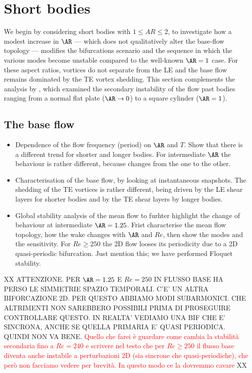 \section{Short bodies}
\label{sec:short}

We begin by considering short bodies with $1 \le AR \le 2$, to investigate how a modest increase in $\AR$ --- which does not qualitatively alter the base-flow topology --- modifies the bifurcations scenario and the sequence in which the various modes become unstable compared to the well-known $\AR=1$ case. For these aspect ratios, vortices do not separate from the LE and the base flow remains dominated by the TE vortex shedding. This section complements the analysis by \cite{choi-yang-2014}, which examined the secondary instability of the flow past bodies ranging from a normal flat plate ($\AR \rightarrow 0$) to a square cylinder ($\AR=1$).

\subsection{The base flow}

\begin{itemize}
  \item Dependence of the flow frequency (period) on $\AR$ and $T$. Show that there is a different trend for shorter and longer bodies. For intermediate $\AR$ the behaviour is rather different, because changes from the one to the other.
  \item Characterisation of the base flow, by looking at instantaneous snapshots. The shedding of the TE vortices is rather different, being driven by the LE shear layers for shorter bodies and by the TE shear layers by longer bodies.
  \item Global stability analysis of the mean flow to furhter highlight the change of behaviour at intermediate $\AR=1.25$. Frist characterise the mean flow topology, how the wake changes with $\AR$ and $Re$, then show the modes and the sensitivity. For $Re \ge 250$ the 2D flow looses its periodicity due to a 2D quasi-periodic bifurcation. Just mention this; we have performed Floquet stability.
\end{itemize}

XX ATTENZIONE. PER $\AR=1.25$ E $Re=250$ IN FLUSSO BASE HA PERSO LE SIMMETRIE SPAZIO TEMPORALI. C'E' UN ALTRA BIFORCAZIONE 2D. PER QUESTO ABBIAMO MODI SUBARMONICI. CHE ALTRIMENTI NON SAREBBERO POSSIBILI PRIMA DI PROSEGUIRE CONTROLLARE QUESTO. IN REALTA' VEDIAMO UNA BIF CHE E' SINCRONA, ANCHE SE QUELLA PRIMARIA E' QUASI PERIODICA. QUINDI NON VA BENE. \textcolor{red}{Quello che farei è guardare come cambia la stabilità secondaria fino a $Re=240$ e scrivere nel testo che per $Re \ge 250$ il flusso base diventa anche instabile a perturbazioni 2D (sia sincrone che quasi-periodiche), che però non facciamo vedere per brevità. In questo modo ce la dovremmo cavare} XX

